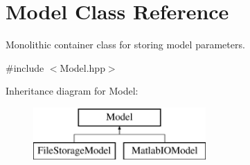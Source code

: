 \hypertarget{classModel}{\section{Model Class Reference}
\label{classModel}
}


Monolithic container class for storing model parameters.  




{\ttfamily \#include $<$Model.\-hpp$>$}

Inheritance diagram for Model\-:\begin{figure}[H]
\begin{center}
\leavevmode
\includegraphics[height=2.000000cm]{classModel}
\end{center}
\end{figure}
